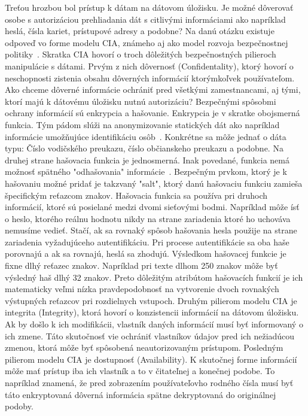 Treťou hrozbou bol prístup k dátam na dátovom úložisku.
Je možné dôverovať osobe s autorizáciou prehliadania dát s citlivými informáciami ako napríklad heslá, čísla kariet, prístupové adresy a podobne?
Na danú otázku existuje odpoveď vo forme modelu CIA, známeho aj ako model rozvoja bezpečnostnej politiky~\cite{CIA}.
Skratka CIA hovorí o troch dôležitých bezpečnostných pilieroch manipulácie s dátami.
Prvým z nich dôvernosť (Confidentality), ktorý hovorí o neschopnosti zistenia obsahu dôverných informácií ktorýmkoľvek používateľom.
Ako chceme dôverné informácie ochrániť pred všetkými zamestnancami, aj tými, ktorí majú k dátovému úložisku nutnú autorizáciu?
Bezpečnými spôsobmi ochrany informácií sú enkrypcia a hašovanie.
Enkrypcia je v skratke obojsmerná funkcia.
Tým pádom slúži na anonymizovanie statických dát ako napríklad informácie umožňujúce identifikáciu osôb~\cite{Encryption}.
Konkrétne sa môže jednať o dáta typu: Číslo vodičského preukazu, číslo občianskeho preukazu a podobne.
Na druhej strane hašovacia funkcia je jednosmerná.
Inak povedané, funkcia nemá možnosť spätného "odhašovania" informácie~\cite{Hashing}.
Bezpečným prvkom, ktorý je k hašovaniu možné pridať je takzvaný "salt", ktorý danú hašovaciu funkciu zamieša špecifickým reťazcom znakov.
Hašovacia funkcia sa používa pri druhoch informácií, ktoré sú posielané medzi dvomi sieťovými bodmi.
Napríklad môže ísť o heslo, ktorého reálnu hodnotu nikdy na strane zariadenia ktoré ho uchováva nemusíme vedieť.
Stačí, ak sa rovnaký spôsob hašovania hesla použije na strane zariadenia vyžadujúceho autentifikáciu.
Pri procese autentifikácie sa oba haše porovnajú a ak sa rovnajú, heslá sa zhodujú.
Výsledkom hašovacej funkcie je fixne dlhý reťazec znakov.
Napríklad pri texte dlhom 250 znakov môže byť výsledný haš dlhý 32 znakov.
Preto dôležitým atribútom hašovacích funkcií je ich matematicky veľmi nízka pravdepodobnosť na vytvorenie dvoch rovnakých
výstupných reťazcov pri rozdielnych vstupoch.
Druhým pilierom modelu CIA je integrita (Integrity), ktorá hovorí o konzistencii informácií na dátovom úložisku.
Ak by došlo k ich modifikácii, vlastník daných informácií musí byť informovaný o ich zmene.
Táto skutočnosť vie ochrániť vlastníkov údajov pred ich nežiadúcou zmenou, ktorá môže byť spôsobená neautorizovaným prístupom.
Posledným pilierom modelu CIA je dostupnosť (Availability).
K skutočnej forme informácií môže mať prístup iba ich vlastník a to v čitateľnej a konečnej podobe.
To napríklad znamená, že pred zobrazením používateľovho rodného čísla musí byť táto enkryptovaná dôverná informácia
spätne dekryptovaná do originálnej podoby.

